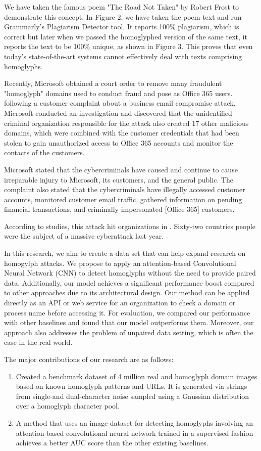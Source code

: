 \documentclass[letterpaper]{article} \usepackage{aaai22}  \usepackage{times}  \usepackage{helvet}  \usepackage{courier}  \usepackage[hyphens]{url}  \usepackage{graphicx} \urlstyle{rm} \def\UrlFont{\rm}  \usepackage{natbib}  \usepackage{caption} \DeclareCaptionStyle{ruled}{labelfont=normalfont,labelsep=colon,strut=off} \frenchspacing  \setlength{\pdfpagewidth}{8.5in}  \setlength{\pdfpageheight}{11in}  \usepackage{algorithm}
\begin{document}
We have taken the famous poem "The Road Not Taken" by Robert Frost to demonstrate this concept. In Figure 2, we have taken the poem text and run Grammarly's Plagiarism Detector tool. It reports 100\% plagiarism, which is correct but later when we passed the homoglyphed version of the same text, it reports the text to be 100\% unique, as shown in Figure 3. This proves that even today's state-of-the-art systems cannot effectively deal with texts comprising homoglyphs.

Recently, Microsoft obtained a court order to remove many fraudulent "homoglyph" domains used to conduct fraud and pose as Office 365 users.\cite{Microsof97:online} following a customer complaint about a business email compromise attack, Microsoft conducted an investigation and discovered that the unidentified criminal organization responsible for the attack also created 17 other malicious domains, which were combined with the customer credentials that had been stolen to gain unauthorized access to Office 365 accounts and monitor the contacts of the customers.

Microsoft stated that the cybercriminals have caused and continue to cause irreparable injury to Microsoft, its customers, and the general public. The complaint also stated that the cybercriminals have illegally accessed customer accounts, monitored customer email traffic, gathered information on pending financial transactions, and criminally impersonated [Office 365] customers.

According to studies, this attack hit  organizations in . Sixty-two countries people were the subject of a massive cyberattack last year.

In this research, we aim to create a data set that can help expand research on homogylph attacks. We propose to apply an attention-based Convolutional Neural Network (CNN) to detect homoglyphs without the need to provide paired data. Additionally, our model achieves a significant performance boost compared to other approaches due to its architectural design. Our method can be applied directly as an API or web service for an organization to check a domain or process name before accessing it. For evaluation, we compared our performance with other baselines and found that our model outperforms them. Moreover, our approach also addresses the problem of unpaired data setting, which is often the case in the real world. 

The major contributions of our research are as follows:
\begin{enumerate}

\item Created a benchmark dataset of 4 million real and homoglyph domain images based on known homoglyph patterns and URLs. It is generated via strings from single-and dual-character noise sampled using a Gaussian distribution over a homoglyph character pool. 


\item A method that uses an image dataset for detecting homoglyphs involving an attention-based convolutional neural network trained in a supervised fashion achieves a better AUC score than the other existing baselines.
\end{enumerate} 
\end{document}
